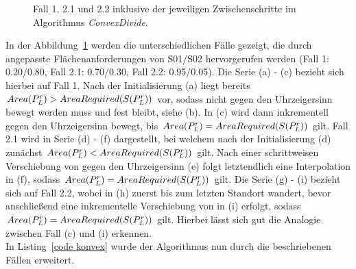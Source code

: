 \documentclass[ngerman]{seminarbeitrag}
\begin{document}
\begin{figure}[hb]
    \qquad
    \centering
    \caption{Fall 1, 2.1 und 2.2 inklusive der jeweiligen Zwischenschritte im Algorithmus \mbox{\textit{ConvexDivide}}.}
    \label{zweites beispiel}
\end{figure}

In der Abbildung~\ref{zweites beispiel} werden die unterschiedlichen Fälle gezeigt, die durch angepasste Flächenanforderungen von S01/S02 hervorgerufen werden (Fall 1: 0.20/0.80, Fall 2.1: 0.70/0.30, Fall 2.2: 0.95/0.05). Die Serie (a) - (c) bezieht sich hierbei auf Fall 1. Nach der Initialisierung (a) liegt bereits $Area(P_{L}^{r}) > AreaRequired(S(P_{L}^{r}))$ vor, sodass \Le nicht gegen den Uhrzeigersinn bewegt werden muss und fest bleibt, siehe (b). In (c) wird \ls dann inkrementell gegen den Uhrzeigersinn bewegt, bis $Area(P_{L}^{r})=AreaRequired(S(P_{L}^{r}))$ gilt. Fall 2.1 wird in Serie (d) - (f) dargestellt, bei welchem nach der Initialisierung (d) zunächst $Area(P_{L}^{r}) < AreaRequired(S(P_{L}^{r}))$ gilt. Nach einer schrittweisen Verschiebung von \Le gegen den Uhrzeigersinn (e) folgt letztendlich eine Interpolation in (f), sodass $Area(P_{L}^{r})=AreaRequired(S(P_{L}^{r}))$ gilt. Die Serie (g) - (i) bezieht sich auf Fall 2.2, wobei \Le in (h) zuerst bis zum letzten Standort wandert, bevor anschließend eine inkrementelle Verschiebung von \ls in (i) erfolgt, sodass $Area(P_{L}^{r})=AreaRequired(S(P_{L}^{r}))$ gilt. Hierbei lässt sich gut die Analogie zwischen Fall (c) und (i) erkennen.\\
In Listing~\ref{code konvex} wurde der Algorithmus \con nun durch die beschriebenen Fällen erweitert.
\end{document}
